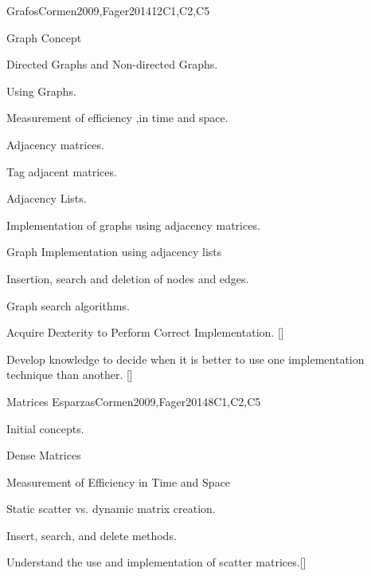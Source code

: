 \begin{syllabus}
\begin{unit}{}{Grafos}{Cormen2009,Fager2014}{12}{C1,C2,C5}
   \begin{topics}
    \item Graph Concept
    \item Directed Graphs and  Non-directed Graphs.
    \item Using Graphs.
    \item Measurement of efficiency ,in time and space.
    \item Adjacency matrices.
    \item Tag adjacent matrices.
    \item Adjacency Lists.
    \item Implementation of graphs using adjacency matrices.
    \item Graph Implementation using adjacency lists
    \item Insertion, search and deletion of nodes and edges.
    \item Graph search algorithms.
   \end{topics}
   \begin{learningoutcomes}
      \item  Acquire Dexterity to Perform Correct Implementation. [\Usage]
      \item  Develop knowledge to decide when it is better to use one implementation technique than another. [\Usage]   
   \end{learningoutcomes}
\end{unit}

\begin{unit}{}{Matrices Esparzas}{Cormen2009,Fager2014}{8}{C1,C2,C5}
   \begin{topics}
    \item  Initial concepts.
    \item  Dense Matrices
    \item  Measurement of Efficiency in Time and Space
    \item  Static scatter vs. dynamic matrix creation.
    \item  Insert, search, and delete methods.
   \end{topics}

\begin{learningoutcomes}
      \item Understand the use and implementation of scatter matrices.[\Assessment]
   \end{learningoutcomes}
\end{unit}


\end{syllabus}
